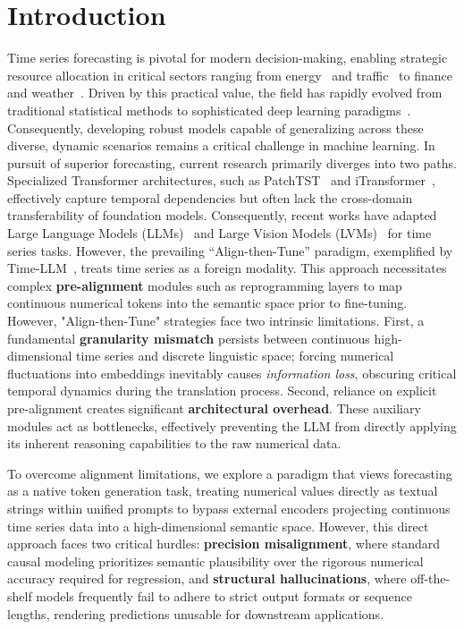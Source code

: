 \section{Introduction}

Time series forecasting is pivotal for modern decision-making, enabling strategic resource allocation in critical sectors ranging from energy~\citep{zhou2021informer} and traffic~\citep{li2018dcrnn} to finance and weather~\citep{jin2024surveygnn}. Driven by this practical value, the field has rapidly evolved from traditional statistical methods to sophisticated deep learning paradigms~\citep{makridakis2018m4, wen2022transformers}. Consequently, developing robust models capable of generalizing across these diverse, dynamic scenarios remains a critical challenge in machine learning.
In pursuit of superior forecasting, current research primarily diverges into two paths. Specialized Transformer architectures, such as PatchTST~\citep{nie2022time} and iTransformer~\citep{liu2023itransformer}, effectively capture temporal dependencies but often lack the cross-domain transferability of foundation models. Consequently, recent works have adapted Large Language Models (LLMs)~\citep{zhou2023one, jin2024timellm} and Large Vision Models (LVMs)~\citep{shen2025dmmv, zhong2025time} for time series tasks. However, the prevailing ``Align-then-Tune'' paradigm, exemplified by Time-LLM~\citep{jin2024timellm}, treats time series as a foreign modality. This approach necessitates complex \textbf{pre-alignment} modules such as reprogramming layers to map continuous numerical tokens into the semantic space prior to fine-tuning.
However, "Align-then-Tune" strategies face two intrinsic limitations. First, a fundamental \textbf{granularity mismatch} persists between continuous high-dimensional time series and discrete linguistic space; forcing numerical fluctuations into embeddings inevitably causes \textit{information loss}, obscuring critical temporal dynamics during the translation process. Second, reliance on explicit pre-alignment creates significant \textbf{architectural overhead}. These auxiliary modules act as bottlenecks, effectively preventing the LLM from directly applying its inherent reasoning capabilities to the raw numerical data.



To overcome alignment limitations, we explore a paradigm that views forecasting as a native token generation task, treating numerical values directly as textual strings within unified prompts to bypass external encoders projecting continuous time series data into a high-dimensional semantic space. However, this direct approach faces two critical hurdles: \textbf{precision misalignment}, where standard causal modeling prioritizes semantic plausibility over the rigorous numerical accuracy required for regression, and \textbf{structural hallucinations}, where off-the-shelf models frequently fail to adhere to strict output formats or sequence lengths, rendering predictions unusable for downstream applications.

